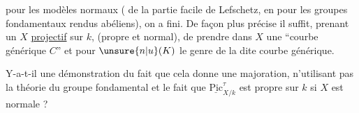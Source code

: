 
pour les modèles normaux ( de la partie facile de Lefschetz, en  pour les groupes fondamentaux rendus abéliens), on a fini. De façon plus précise il suffit, prenant un  $X$ \uline{projectif} sur $k$, (propre et normal), de prendre dans $X$ une ``courbe générique $C$'' et pour $\unsure{n|u}(K)$ le genre de la dite courbe générique.


Y-a-t-il une démonstration du fait que cela donne une majoration, n'utilisant pas la théorie du groupe fondamental et le fait que $\underline{\mathrm{Pic}}^{\tau}_{X/k}$ est propre sur $k$ si $X$ est normale ?
